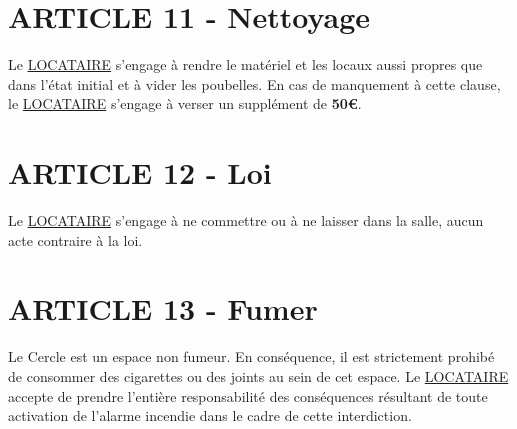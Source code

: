 \documentclass{article}
\begin{document}
\section*{ARTICLE 11 - Nettoyage}
Le \underline{LOCATAIRE} s’engage à rendre le matériel et les locaux aussi propres que dans l’état initial et à vider les poubelles. En cas de manquement à cette clause, le \underline{LOCATAIRE} s’engage à verser un supplément de \textbf{50€}.

\section*{ARTICLE 12 - Loi}
Le \underline{LOCATAIRE} s’engage à ne commettre ou à ne laisser dans la salle, aucun acte contraire à la loi.

\section{ARTICLE 13 - Fumer}
Le Cercle est un espace non fumeur.  En conséquence, il est strictement prohibé de consommer des cigarettes ou des joints au sein de cet espace. Le \underline{LOCATAIRE} accepte de prendre l'entière responsabilité des conséquences résultant de toute activation de l'alarme incendie dans le cadre de cette interdiction.
\end{document}
